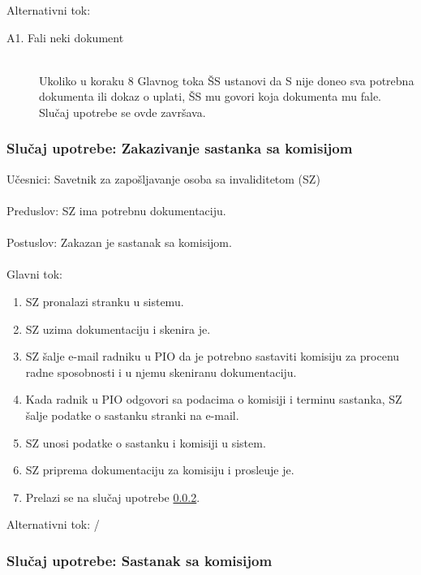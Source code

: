 \noindent Alternativni tok:
\begin{description}
	\item[A1. Fali neki dokument] ~\\
	Ukoliko u koraku 8 Glavnog toka \v SS ustanovi da S nije doneo sva potrebna dokumenta ili dokaz o uplati, \v SS mu govori koja dokumenta mu fale. Slu\v caj upotrebe se ovde zavr\v sava.
\end{description}

\subsubsection{Slu\v caj upotrebe: Zakazivanje sastanka sa komisijom}

\label{su: zakazivanje sastanka}

\noindent U\v cesnici: Savetnik za zapo\v sljavanje osoba sa invaliditetom (SZ)
\\
\\ Preduslov: SZ ima potrebnu dokumentaciju.
\\
\\ Postuslov: Zakazan je sastanak sa komisijom.
\\
\\ Glavni tok:
\begin{enumerate}
	\item SZ pronalazi stranku u sistemu.
	\item SZ uzima dokumentaciju i skenira je.
	\item SZ \v salje e-mail radniku u PIO da je potrebno sastaviti komisiju za procenu radne sposobnosti i u njemu skeniranu dokumentaciju.
	\item Kada radnik u PIO odgovori sa podacima o komisiji i terminu sastanka, SZ \v salje podatke o sastanku stranki na e-mail.
	\item SZ unosi podatke o sastanku i komisiji u sistem.
	\item SZ priprema dokumentaciju za komisiju i prosle\dj uje je.
	\item Prelazi se na slu\v caj upotrebe \ref{su: sastanak}.
\end{enumerate}

\noindent Alternativni tok: /


\subsubsection{Slu\v caj upotrebe: Sastanak sa komisijom}

\label{su: sastanak}

